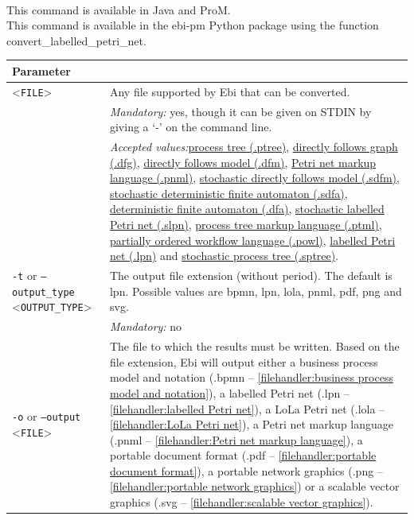 {\\This command is available in Java and ProM.
\\This command is available in the ebi-pm Python package using the function convert\_labelled\_petri\_net.
\begin{tabularx}{\linewidth}{lX}
\toprule
Parameter \\\midrule
<\texttt{FILE}>&Any file supported by Ebi that can be converted.\\
&\textit{Mandatory:} \quad yes, though it can be given on STDIN by giving a `-' on the command line.\\
&\textit{Accepted values:}\quad \hyperref[filehandler:process tree]{process tree (.ptree)}, \hyperref[filehandler:directly follows graph]{directly follows graph (.dfg)}, \hyperref[filehandler:directly follows model]{directly follows model (.dfm)}, \hyperref[filehandler:Petri net markup language]{Petri net markup language (.pnml)}, \hyperref[filehandler:stochastic directly follows model]{stochastic directly follows model (.sdfm)}, \hyperref[filehandler:stochastic deterministic finite automaton]{stochastic deterministic finite automaton (.sdfa)}, \hyperref[filehandler:deterministic finite automaton]{deterministic finite automaton (.dfa)}, \hyperref[filehandler:stochastic labelled Petri net]{stochastic labelled Petri net (.slpn)}, \hyperref[filehandler:process tree markup language]{process tree markup language (.ptml)}, \hyperref[filehandler:partially ordered workflow language]{partially ordered workflow language (.powl)}, \hyperref[filehandler:labelled Petri net]{labelled Petri net (.lpn)} and \hyperref[filehandler:stochastic process tree]{stochastic process tree (.sptree)}.\\
\texttt{-t} or \texttt{--output\_type} <\texttt{OUTPUT\_TYPE}> &
The output file extension (without period). The default is lpn. Possible values are bpmn, lpn, lola, pnml, pdf, png and svg.\\
&\textit{Mandatory:} \quad no\\
\texttt{-o} or \texttt{--output} <\texttt{FILE}> &
The file to which the results must be written. Based on the file extension, Ebi will output either a business process model and notation (.bpmn -- \cref{filehandler:business process model and notation}), a labelled Petri net (.lpn -- \cref{filehandler:labelled Petri net}), a LoLa Petri net (.lola -- \cref{filehandler:LoLa Petri net}), a Petri net markup language (.pnml -- \cref{filehandler:Petri net markup language}), a portable document format (.pdf -- \cref{filehandler:portable document format}), a portable network graphics (.png -- \cref{filehandler:portable network graphics}) or a scalable vector graphics (.svg -- \cref{filehandler:scalable vector graphics}).

\end{tabularx}}
